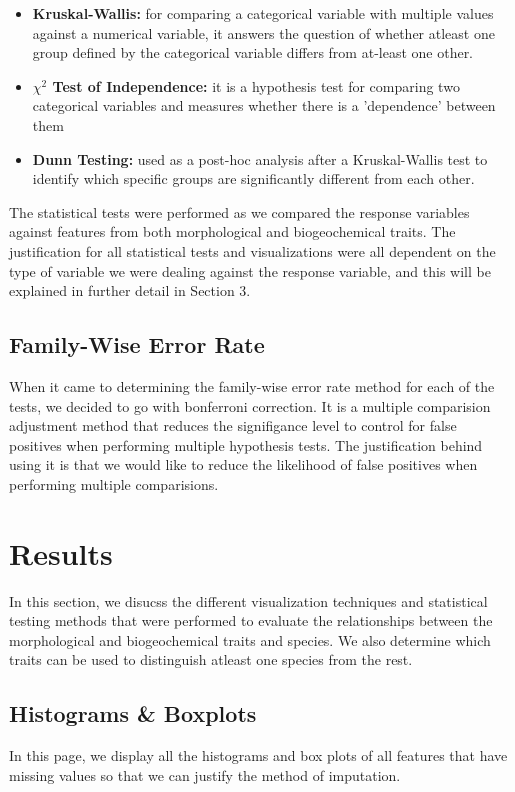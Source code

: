\documentclass[a4paper]{article}
\begin{document}
\begin{itemize}
    \item \textbf{Kruskal-Wallis:} for comparing a categorical variable with multiple values against a numerical variable, it answers the question of whether
    atleast one group defined by the categorical variable differs from at-least one other.
    \item \textbf{$\chi^2$ Test of Independence:} it is a hypothesis test for comparing two categorical variables and measures whether there is a 'dependence' 
    between them
    \item \textbf{Dunn Testing:} used as a post-hoc analysis after a Kruskal-Wallis test to identify which specific groups are significantly different from
    each other.
\end{itemize}

\noindent The statistical tests were performed as we compared the response variables against features from both morphological and biogeochemical traits. The 
justification for all statistical tests and visualizations were all dependent on the type of variable we were dealing against the response variable, and this
will be explained in further detail in Section 3.

\subsection{Family-Wise Error Rate}
When it came to determining the family-wise error rate method for each of the tests, we decided to go with bonferroni correction. It is a multiple comparision
adjustment method that reduces the signifigance level to control for false positives when performing multiple hypothesis tests. The justification behind using
it is that we would like to reduce the likelihood of false positives when performing multiple comparisions. 


\newpage

\section{Results}
In this section, we disucss the different visualization techniques and statistical testing methods that were performed to evaluate the relationships between
the morphological and biogeochemical traits and species. We also determine which traits can be used to distinguish atleast one species from the rest.

\subsection{Histograms \& Boxplots}
In this page, we display all the histograms and box plots of all features that have missing values so that we can justify the method of imputation. 
\vspace{0.5cm}
\end{document}
